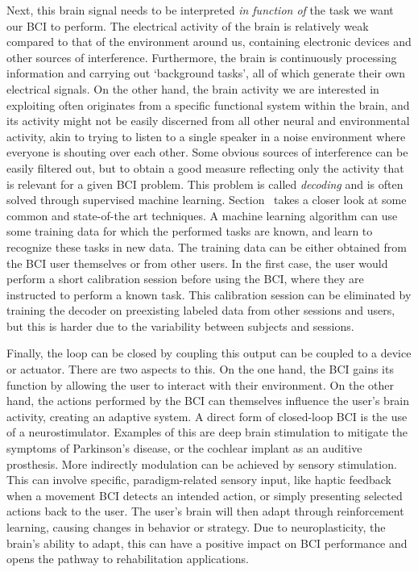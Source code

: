 Next, this brain signal needs to be interpreted \emph{in function of} the
task we want our BCI to perform.
The electrical activity of the brain is relatively weak compared to that of the
environment around us, containing electronic devices and other sources of
interference.
Furthermore, the brain is continuously processing information and carrying out
`background tasks', all of which generate their own electrical signals.
On the other hand, the brain activity we are interested in exploiting often
originates from a specific functional system within the brain, and its activity
might not be easily discerned from all other neural and environmental activity,
akin to trying to listen to a single speaker in a noise environment where
everyone is shouting over each other.
Some obvious sources of interference can be easily filtered out, but to obtain
a good measure reflecting only the activity that is relevant for a given BCI
problem.
This problem is called \emph{decoding} and is often solved through supervised
machine learning.
Section~\label{sec:bci-decoding} takes a closer look at some common and
state-of-the art techniques.
A machine learning algorithm can use some training data for which the performed
tasks are known, and learn to recognize these tasks in new data.
The training data can be either obtained from the BCI user themselves or from
other users.
In the first case, the user would perform a short calibration session before
using the BCI, where they are instructed to perform a known task.
This calibration session can be eliminated by training the decoder on
preexisting labeled data from other sessions and users, but this is harder due
to the variability between subjects and sessions.

Finally, the loop can be closed by coupling this output can be coupled to a
device or actuator.
There are two aspects to this.
On the one hand, the BCI gains its function by allowing the user to interact
with their environment.
On the other hand, the actions performed by the BCI can themselves influence
the user's brain activity, creating an adaptive system.
A direct form of closed-loop BCI is the use of a neurostimulator.
Examples of this are deep brain stimulation to mitigate the symptoms of
Parkinson's disease, or the cochlear implant as an auditive prosthesis.
More indirectly modulation can be achieved by sensory stimulation.
This can involve specific, paradigm-related sensory input, like haptic feedback when a
movement BCI detects an intended action, or simply presenting selected actions
back to the user.
The user's brain will then adapt through reinforcement learning, causing
changes in behavior or strategy.
Due to neuroplasticity, the brain's ability to adapt, this can have a positive
impact on BCI performance and opens the pathway to rehabilitation applications.



